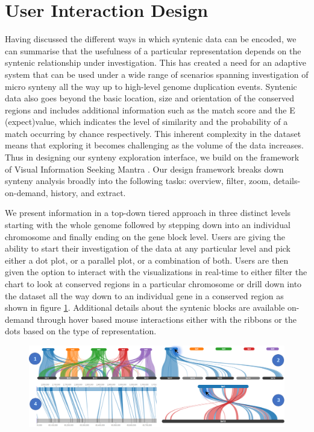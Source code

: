 \section{User Interaction Design}

Having discussed the different ways in which syntenic data can be encoded, we can summarise that the usefulness of a particular representation depends on the syntenic relationship under investigation. This has created a need for an adaptive system that can be used under a wide range of scenarios spanning investigation of micro synteny all the way up to high-level genome duplication events. Syntenic data also goes beyond the basic location, size and orientation of the conserved regions and includes additional information such as the match score and the E (expect)value, which indicates the level of similarity and the probability of a match occurring by chance respectively. This inherent complexity in the dataset means that exploring it becomes challenging as the volume of the data increases. Thus in designing our synteny exploration interface, we build on the framework of Visual Information Seeking Mantra \cite{Shneiderman96theeyes}. Our design framework breaks down synteny analysis broadly into the following tasks: overview, filter, zoom, details-on-demand, history, and extract.

We present information in a top-down tiered approach in three distinct levels starting with the whole genome followed by stepping down into an individual chromosome and finally ending on the gene block level. Users are giving the ability to start their investigation of the data at any particular level and pick either a dot plot, or a parallel plot, or a combination of both. Users are then given the option to interact with the visualizations in real-time to either filter the chart to look at conserved regions in a particular chromosome or drill down into the dataset all the way down to an individual gene in a conserved region as shown in figure \ref{fig:ch_4_exploration_through_interaction}. Additional details about the syntenic blocks are available on-demand through hover based mouse interactions either with the ribbons or the dots based on the type of representation.

\begin{figure}[h]
  \centering
  \includegraphics[width=1\linewidth]{images/ch_4_exploration_through_interaction.PNG}
  \label{fig:ch_4_exploration_through_interaction}
\end{figure}


